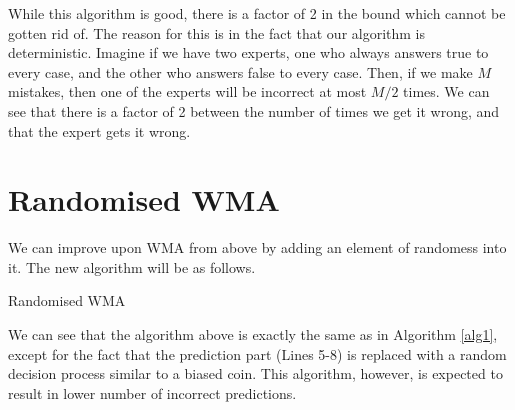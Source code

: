 \documentclass[12pt]{article}
\begin{document}
While this algorithm is good, there is a factor of 2 in the bound which cannot be gotten rid of. The reason for this is in the fact that our algorithm is deterministic. Imagine if we have two experts, one who always answers true to every case, and the other who answers false to every case. Then, if we make $M$ mistakes, then one of the experts will be incorrect at most $M/2$ times. We can see that there is a factor of 2 between the number of times we get it wrong, and that the expert gets it wrong.

\section{Randomised WMA}

We can improve upon WMA from above by adding an element of randomess into it. The new algorithm will be as follows.
\begin{algorithm}[H]
	\caption{Randomised WMA}
	\begin{algorithmic}[1]
		\EndFor
		\EndFunction
	\end{algorithmic}
\end{algorithm}

We can see that the algorithm above is exactly the same as in Algorithm \ref{alg1}, except for the fact that the prediction part (Lines 5-8) is replaced with a random decision process similar to a biased coin. This algorithm, however, is expected to result in lower number of incorrect predictions.
\end{document}

